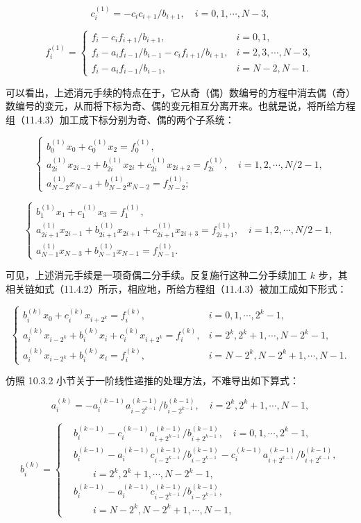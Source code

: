 \documentclass[
  10pt,
  fontset=fandol]{ctexart}
\begin{document}
\[
c_i^{(1)}=-c_i c_{i+1}/b_{i+1},\quad i=0,1,\cdots,N-3,
\]

\[
f_i^{(1)}=
\begin{cases}
f_i-c_i f_{i+1}/b_{i+1},& i=0,1,\\
f_i-a_i f_{i-1}/b_{i-1}-c_i f_{i+1}/b_{i+1},& i=2,3,\cdots,N-3,\\
f_i-a_i f_{i-1}/b_{i-1},& i=N-2,N-1.
\end{cases}
\]

可以看出，上述消元手续的特点在于，它从奇（偶）数编号的方程中消去偶（奇）数编号的变元，从而将下标为奇、偶的变元相互分离开来。也就是说，将所给方程组（11.4.3）加工成下标分别为奇、偶的两个子系统：

\[
\begin{cases}
b_0^{(1)}x_0+c_0^{(1)}x_2=f_0^{(1)},\\
a_{2i}^{(1)}x_{2i-2}+b_{2i}^{(1)}x_{2i}+c_{2i}^{(1)}x_{2i+2}=f_{2i}^{(1)},\quad i=1,2,\cdots,N/2-1,\\
a_{N-2}^{(1)}x_{N-4}+b_{N-2}^{(1)}x_{N-2}=f_{N-2}^{(1)};
\end{cases}
\]

\[
\begin{cases}
b_1^{(1)}x_1+c_1^{(1)}x_3=f_1^{(1)},\\
a_{2i+1}^{(1)}x_{2i-1}+b_{2i+1}^{(1)}x_{2i+1}+c_{2i+1}^{(1)}x_{2i+3}=f_{2i+1}^{(1)},\quad i=1,2,\cdots,N/2-1,\\
a_{N-1}^{(1)}x_{N-3}+b_{N-1}^{(1)}x_{N-1}=f_{N-1}^{(1)}.
\end{cases}
\]

可见，上述消元手续是一项奇偶二分手续。反复施行这种二分手续加工 \(k\) 步，其相关链如式（11.4.2）所示，相应地，所给方程组（11.4.3）被加工成如下形式：

\[
\begin{cases}
b_i^{(k)}x_0+c_i^{(k)}x_{i+2^k}=f_i^{(k)},& i=0,1,\cdots,2^k-1,\\
a_i^{(k)}x_{i-2^k}+b_i^{(k)}x_i+c_i^{(k)}x_{i+2^k}=f_i^{(k)},& i=2^k,2^k+1,\cdots,N-2^k-1,\\
a_i^{(k)}x_{i-2^k}+b_i^{(k)}x_i=f_i^{(k)},& i=N-2^k,N-2^k+1,\cdots,N-1.
\end{cases}
\]

仿照 10.3.2 小节关于一阶线性递推的处理方法，不难导出如下算式：

\[
a_i^{(k)}=-a_i^{(k-1)}a_{i-2^{k-1}}^{(k-1)}/b_{i-2^{k-1}}^{(k-1)},\quad i=2^k,2^k+1,\cdots,N-1,
\]

\[
b_i^{(k)}=
\left\{
\begin{aligned}
&b_i^{(k-1)}-c_i^{(k-1)}a_{i+2^{k-1}}^{(k-1)}/b_{i+2^{k-1}}^{(k-1)},\quad i=0,1,\cdots,2^k-1,\\
&b_i^{(k-1)}-a_i^{(k-1)}c_{i-2^{k-1}}^{(k-1)}/b_{i-2^{k-1}}^{(k-1)}-c_i^{(k-1)}a_{i+2^{k-1}}^{(k-1)}/b_{i+2^{k-1}}^{(k-1)},\\
&\qquad i=2^k,2^k+1,\cdots,N-2^k-1,\\
&b_i^{(k-1)}-a_i^{(k-1)}c_{i-2^{k-1}}^{(k-1)}/b_{i-2^{k-1}}^{(k-1)},\\
&\qquad i=N-2^k,N-2^k+1,\cdots,N-1,
\end{aligned}
\right.
\]
\end{document}
